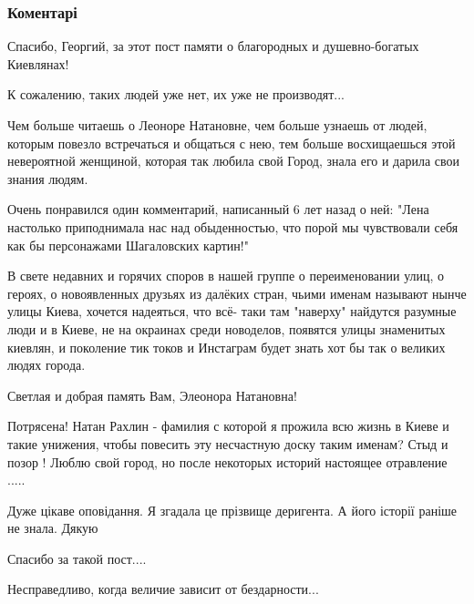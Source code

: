  
 
 
 
 
\subsubsection{Коментарі}

\begin{itemize} %

Спасибо, Георгий, за этот пост памяти о благородных и душевно-богатых
Киевлянах!

К сожалению, таких людей уже нет, их уже не производят...

Чем больше читаешь о Леоноре Натановне, чем больше узнаешь от людей, которым
повезло встречаться и общаться с нею, тем больше восхищаешься этой невероятной
женщиной, которая так любила свой Город, знала его и дарила свои знания людям.

Очень понравился один комментарий, написанный 6 лет назад о ней: "Лена
настолько приподнимала нас над обыденностью, что порой мы чувствовали себя как
бы персонажами Шагаловских картин!"

В свете недавних и горячих споров в нашей группе о переименовании улиц, о
героях, о новоявленных друзьях из далёких стран, чьими именам называют нынче
улицы Киева, хочется надеяться, что всё- таки там "наверху" найдутся разумные
люди и в Киеве, не на окраинах среди новоделов, появятся улицы знаменитых
киевлян, и поколение тик токов и Инстаграм будет знать хот бы так о великих
людях города.

Светлая и добрая память Вам, Элеонора Натановна!


Потрясена! Натан Рахлин - фамилия с которой я прожила всю жизнь в Киеве и
такие унижения, чтобы повесить эту несчастную доску таким именам? Стыд и позор
! Люблю свой город, но после некоторых историй настоящее отравление .....

Дуже цікаве оповідання. Я згадала це прізвище деригента. А його історії раніше не знала. Дякую

Спасибо за такой пост....

Несправедливо, когда величие зависит от бездарности...

\end{itemize} %
